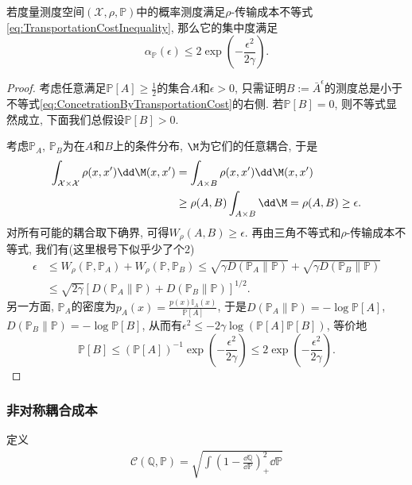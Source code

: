  
\begin{theorem}
	若度量测度空间$(\mathcal{X}, \rho, \mathbb{P})$中的概率测度满足$\rho$-传输成本不等式\eqref{eq:TransportationCostInequality}, 那么它的集中度满足
	\begin{equation}\label{eq:ConcetrationByTransportationCost}
		\alpha_{\mathbb{P}}(\epsilon) \leq 2 \exp \left(- \frac{\epsilon^2}{2 \gamma} \right).
	\end{equation}
\end{theorem}
\begin{proof}
	考虑任意满足$\mathbb{P}[A] \geq \frac12$的集合$A$和$\epsilon > 0$, 只需证明$B := \bar A^{\epsilon}$的测度总是小于不等式\eqref{eq:ConcetrationByTransportationCost}的右侧. 
	若$\mathbb{P}[B] = 0$, 则不等式显然成立, 下面我们总假设$\mathbb{P}[B] > 0$. 
	
	考虑$\mathbb{P}_A$, $\mathbb{P}_B$为在$A$和$B$上的条件分布, $\M$为它们的任意耦合, 于是
	\begin{align*}
		\int_{\mathcal{X} \times \mathcal{X}} \rho(x, x') \dd \M(x, x')
		&= \int_{A \times B} \rho(x, x') \dd \M(x, x') \\
		&\geq \rho(A, B) \int_{A \times B} \dd \M 
		= \rho(A, B) 
		\geq \epsilon. 
	\end{align*}
	对所有可能的耦合取下确界, 可得$W_{\rho}(A, B) \geq \epsilon$. 
	再由三角不等式和$\rho$-传输成本不等式, 我们有(这里根号下似乎少了个2)
	\begin{align*}
		\epsilon 
		&\leq W_{\rho}(\mathbb{P}, \mathbb{P}_A) + W_{\rho}(\mathbb{P}, \mathbb{P}_B) 
		\leq \sqrt{\gamma D(\mathbb{P}_A \| \mathbb{P})} + \sqrt{\gamma D(\mathbb{P}_B \| \mathbb{P})} \\
		&\leq \sqrt{2 \gamma} \left[ D(\mathbb{P}_A \| \mathbb{P}) + D(\mathbb{P}_B \| \mathbb{P}) \right]^{1/2}.
	\end{align*}
	另一方面, $\mathbb{P}_A$的密度为$p_A(x) = \frac{p(x) \mathbb I_A(x)}{\mathbb{P}[A]}$, 于是$D(\mathbb{P}_A \| \mathbb{P}) = - \log \mathbb{P}[A]$, $D(\mathbb{P}_B \| \mathbb{P}) = -\log \mathbb{P}[B]$, 从而有$\epsilon^2 \leq -  2 \gamma \log (\mathbb{P}[A] \mathbb{P}[B])$, 等价地
	\begin{equation*}
		 \mathbb{P}[B] 
		 \leq (\mathbb{P}[A])^{-1} \exp\left(- \frac{\epsilon^2}{2 \gamma} \right) 
		 \leq 2 \exp\left(- \frac{\epsilon^2}{2 \gamma} \right). 
	\end{equation*}
\end{proof}



\subsubsection{非对称耦合成本}

定义
\begin{align*}
	\mathcal{C}(\mathbb{Q}, \mathbb{P})
	= \sqrt{\int\left(1 - \frac{\dd \mathbb{Q}}{\dd \mathbb{P}} \right)_+^2 \dd \mathbb{P}}
\end{align*}




















